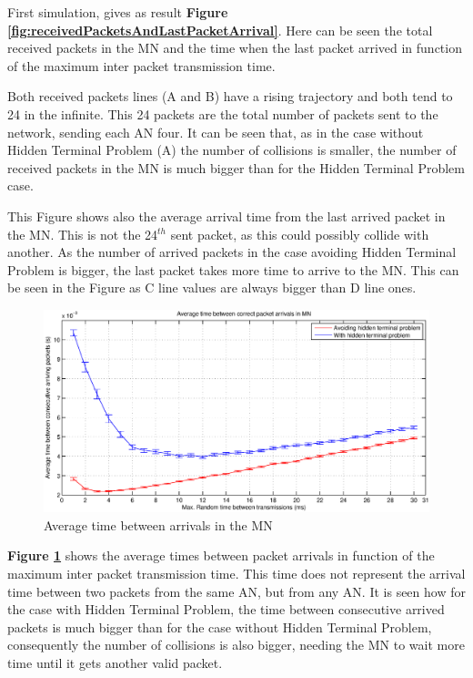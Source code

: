 First simulation, gives as result \textbf{Figure \ref{fig:receivedPacketsAndLastPacketArrival}}. Here can be seen the total received packets in the 
\ac{MN} and the time when the last packet arrived in function of the maximum inter packet transmission time.

Both received packets lines (A and B) have a rising trajectory and both tend to 24 in the infinite. This 24 packets are the total number of 
packets sent to the network, sending each \ac{AN} four. It can be seen that, as in the case without Hidden Terminal Problem (A) the number of collisions
is smaller, the number of received packets in the \ac{MN} is much bigger than for the Hidden Terminal Problem case.

This Figure shows also the average arrival time from the last arrived packet in the \ac{MN}. This is not the 24$^{th}$ sent packet, as this could 
possibly collide with another. As the number of arrived packets in the case avoiding Hidden Terminal Problem is bigger, the last packet takes more time 
to arrive to the \ac{MN}. This can be seen in the Figure as C line values are always bigger than D line ones.

\begin{figure}[ht]
 \begin{center}
  \includegraphics[width=1\textwidth]{averageTimeBetweenArrivals.eps}
 \end{center}
 \caption{Average time between arrivals in the \ac{MN}}
 \label{fig:averageTimeBetweenArrivals}
\end{figure}

\textbf{Figure \ref{fig:averageTimeBetweenArrivals}} shows the average times between packet arrivals in function of the maximum inter packet 
transmission time. This time does not represent the arrival time between two packets from the same \ac{AN}, but from any \ac{AN}. It is seen how
for the case with Hidden Terminal Problem, the time between consecutive arrived packets is much bigger than for the case without Hidden Terminal Problem,
consequently the number of collisions is also bigger, needing the \ac{MN} to wait more time until it gets another valid packet.

